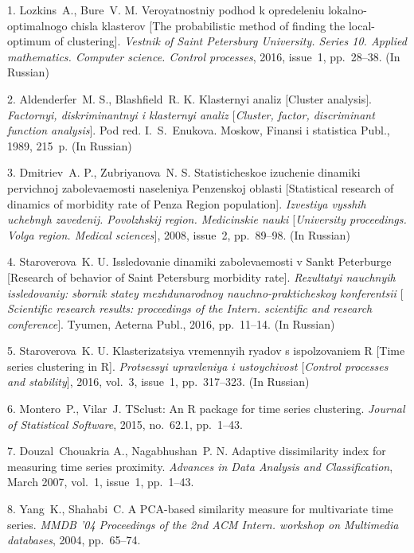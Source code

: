 

{\footnotesize

\vskip 2mm


\vskip 1.5mm



1. Lozkins~A., Bure~V. M. Veroyatnostniy podhod k opredeleniu
lokalno-optimalnogo chisla klasterov [The probabilistic method of
finding the local-optimum of clustering]. {\it Vestnik of Saint
Petersburg University. Series 10. Applied mathematics. Computer
science. Control processes}, 2016, issue~1, pp.~28--38. (In
Russian)

2. Aldenderfer~M. S., Blashfield~R. K. Klasternyi analiz
$[$Cluster analysis$]$. \emph{Factornyi, diskriminantnyi i
klasternyi analiz $[$Cluster, factor, discriminant function
analysis$]$}. Pod red. I.~S.~Enukova. Moskow, Finansi i statistica
Publ., 1989, 215~p. (In Russian)

3. Dmitriev~A. P., Zubriyanova~N. S. Statisticheskoe izuchenie
dinamiki pervichnoj zabolevaemosti naseleniya Penzenskoj oblasti
[Statistical research of dinamics of morbidity rate of Penza
Region population]. {\it Izvestiya vysshih uchebnyh zavedenij.
Povolzhskij region. Medicinskie nauki $[$University proceedings.
Volga region. Medical sciences$]$}, 2008, issue~2, pp.~89--98. (In
Russian)

4. Staroverova~K. U. Issledovanie dinamiki zabolevaemosti v Sankt
Peterburge [Research of behavior of Saint Petersburg morbidity
rate]. {\it Rezultatyi nauchnyih issledovaniy: sbornik statey
mezhdunarodnoy nauchno-prakticheskoy konferentsii $[$Scientific
research results: proceedings of the Intern. scientific and
research conference$]$}. Tyumen, Aeterna Publ., 2016, pp.~11--14.
(In Russian)

5. Staroverova~K. U. Klasterizatsiya vremennyih ryadov s
ispolzovaniem R [Time series clustering in R]. {\it Protsessyi
upravleniya i ustoychivost $[$Control processes and stability$]$},
2016, vol.~3, issue~1, pp.~317--323. (In Russian)

6. Montero~P., Vilar~J. TSclust: An R package for time series
clustering. {\it Journal of Statistical Software}, 2015, no.~62.1,
pp.~1--43.

7. Douzal~Chouakria A., Nagabhushan~P. N. Adaptive dissimilarity
index for measuring time series proximity. {\it Advances in Data
Analysis and Classification}, March 2007, vol.~1, issue~1,
pp.~1--43.

8. Yang~K., Shahabi~C. A PCA-based similarity measure for
multivariate time series. {\it MMDB '04 Proceedings of the 2nd ACM
Intern. workshop on Multimedia databases}, 2004, pp.~65--74.

}
